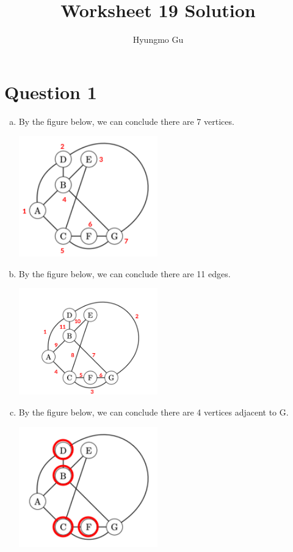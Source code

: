 \documentclass[12pt]{article}
\begin{document}
\title{Worksheet 19 Solution}
\author{Hyungmo Gu}
\maketitle

\section*{Question 1}
\begin{enumerate}[a.]
    \item
    By the figure below, we can conclude there are 7 vertices.

    \begin{center}
    \includegraphics[width=6cm]{images/worksheet_19_q1a_solution.png}
    \end{center}

    \item
    By the figure below, we can conclude there are 11 edges.

    \begin{center}
    \includegraphics[width=6cm]{images/worksheet_19_q1b_solution.png}
    \end{center}

    \newpage
    \item
    By the figure below, we can conclude there are 4 vertices adjacent to G.

    \begin{center}
    \includegraphics[width=6cm]{images/worksheet_19_q1c_solution.png}
    \end{center}


\end{enumerate}
\end{document}
